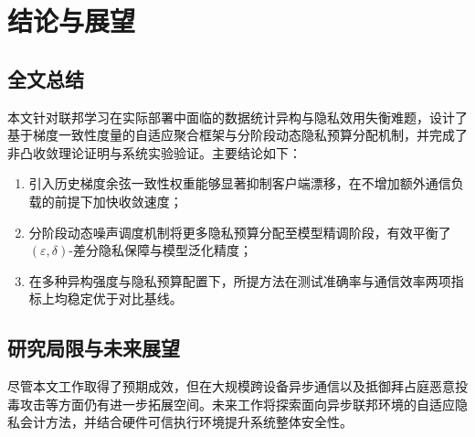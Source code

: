 
\chapter{结论与展望}

\section{全文总结}

本文针对联邦学习在实际部署中面临的数据统计异构与隐私效用失衡难题，设计了基于梯度一致性度量的自适应聚合框架与分阶段动态隐私预算分配机制，并完成了非凸收敛理论证明与系统实验验证。主要结论如下：
\begin{enumerate}[label=（\arabic*）, leftmargin=2\ccwd, itemsep=2pt]
  \item 引入历史梯度余弦一致性权重能够显著抑制客户端漂移，在不增加额外通信负载的前提下加快收敛速度；
  \item 分阶段动态噪声调度机制将更多隐私预算分配至模型精调阶段，有效平衡了 $(\varepsilon, \delta)$-差分隐私保障与模型泛化精度；
  \item 在多种异构强度与隐私预算配置下，所提方法在测试准确率与通信效率两项指标上均稳定优于对比基线。
\end{enumerate}

\section{研究局限与未来展望}

尽管本文工作取得了预期成效，但在大规模跨设备异步通信以及抵御拜占庭恶意投毒攻击等方面仍有进一步拓展空间。未来工作将探索面向异步联邦环境的自适应隐私会计方法，并结合硬件可信执行环境提升系统整体安全性。
